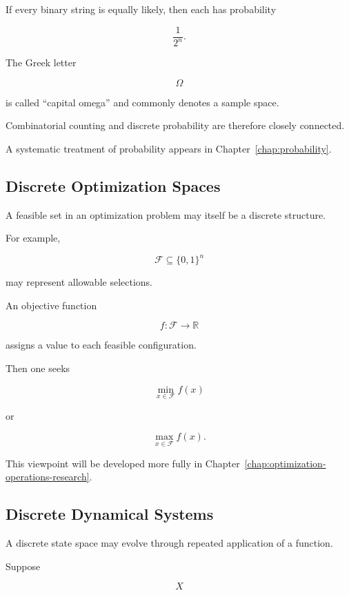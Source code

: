 If every binary string is equally likely, then each has probability

\[
\boxed{
\frac{1}{2^n}.
}
\]

The Greek letter

\[
\Omega
\]

is called ``capital omega'' and commonly denotes a sample space.

Combinatorial counting and discrete probability are therefore closely
connected.

A systematic treatment of probability appears in
Chapter~\ref{chap:probability}.

\subsection{Discrete Optimization Spaces}
\label{subsec:discrete-optimization-spaces}

A feasible set in an optimization problem may itself be a discrete
structure.

For example,

\[
\mathcal{F}\subseteq\{0,1\}^{n}
\]

may represent allowable selections.

An objective function

\[
f:\mathcal{F}\to\mathbb{R}
\]

assigns a value to each feasible configuration.

Then one seeks

\[
\boxed{
\min_{x\in\mathcal{F}}f(x)
}
\]

or

\[
\boxed{
\max_{x\in\mathcal{F}}f(x).
}
\]

This viewpoint will be developed more fully in
Chapter~\ref{chap:optimization-operations-research}.

\subsection{Discrete Dynamical Systems}
\label{subsec:discrete-dynamical-preview}

A discrete state space may evolve through repeated application of a
function.

Suppose

\[
X
\]

